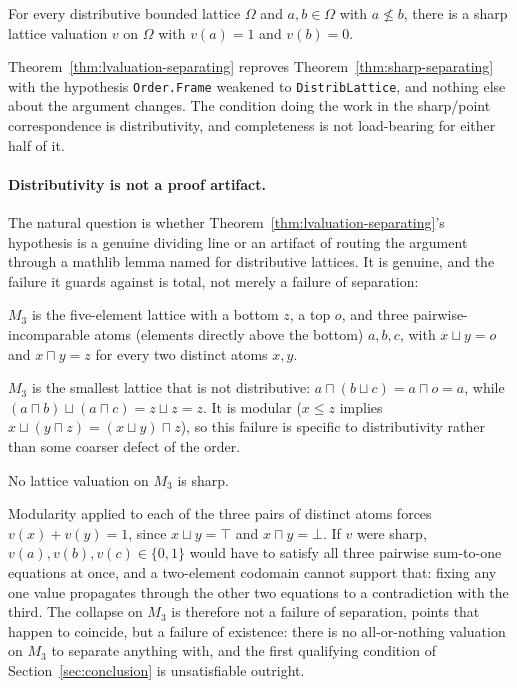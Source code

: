 \begin{theorem}
\label{thm:lvaluation-separating}
For every distributive bounded lattice $\Omega$ and $a, b \in
\Omega$ with $a \not\le b$, there is a sharp lattice valuation $v$
on $\Omega$ with $v(a) = 1$ and $v(b) = 0$.
\end{theorem}

\noindent
Theorem~\ref{thm:lvaluation-separating}
reproves Theorem~\ref{thm:sharp-separating} with the hypothesis
\texttt{Order.Frame} weakened to \texttt{DistribLattice}, and
nothing else about the argument changes. The condition doing the
work in the sharp/point correspondence is distributivity, and
completeness is not load-bearing for either half of it.

\paragraph{Distributivity is not a proof artifact.}
The natural question is whether
Theorem~\ref{thm:lvaluation-separating}'s hypothesis is a genuine
dividing line or an artifact of routing the argument through a
mathlib lemma named for distributive lattices. It is genuine, and
the failure it guards against is total, not merely a failure of
separation:

\begin{definition}
\label{def:m3}
$M_3$ is the five-element lattice with a bottom $z$, a top $o$, and
three pairwise-incomparable atoms (elements directly above the bottom)
$a, b, c$, with $x \sqcup y = o$
and $x \sqcap y = z$ for every two distinct atoms $x, y$.
\end{definition}

\noindent
$M_3$ is the smallest lattice that is not distributive:
$a \sqcap (b \sqcup c) = a \sqcap o = a$, while
$(a \sqcap b) \sqcup (a \sqcap c) = z \sqcup z = z$. It is modular
($x \le z$ implies $x \sqcup (y \sqcap z) = (x \sqcup y) \sqcap z$),
so this failure is specific to distributivity rather than some
coarser defect of the order.

\begin{theorem}
\label{thm:m3-no-sharp}
No lattice valuation on $M_3$ is sharp.
\end{theorem}

\noindent
Modularity applied to each of the three
pairs of distinct atoms forces $v(x) + v(y) = 1$, since
$x \sqcup y = \top$ and $x \sqcap y = \bot$. If $v$ were sharp,
$v(a), v(b), v(c) \in \{0, 1\}$ would have to satisfy all three
pairwise sum-to-one equations at once, and a two-element codomain
cannot support that: fixing any one value propagates through the
other two equations to a contradiction with the third. The collapse
on $M_3$ is therefore not a failure of separation, points that
happen to coincide, but a failure of existence: there is no
all-or-nothing valuation on $M_3$ to separate anything with, and the
first qualifying condition of Section~\ref{sec:conclusion} is
unsatisfiable outright.

